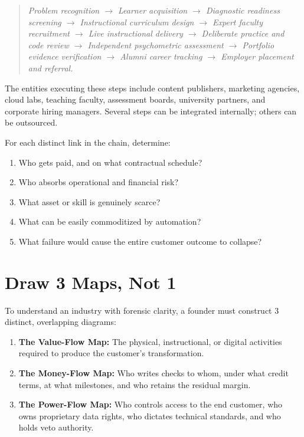 \begin{quote}
\centering\small\itshape
Problem recognition $\to$ Learner acquisition $\to$ Diagnostic readiness screening $\to$ Instructional curriculum design $\to$ Expert faculty recruitment $\to$ Live instructional delivery $\to$ Deliberate practice and code review $\to$ Independent psychometric assessment $\to$ Portfolio evidence verification $\to$ Alumni career tracking $\to$ Employer placement and referral.
\end{quote}

The entities executing these steps include content publishers, marketing agencies, cloud labs, teaching faculty, assessment boards, university partners, and corporate hiring managers. Several steps can be integrated internally; others can be outsourced.

For each distinct link in the chain, determine:
\begin{enumerate}[leftmargin=12pt,itemsep=1pt,topsep=1pt,parsep=0pt]
  \item Who gets paid, and on what contractual schedule?
  \item Who absorbs operational and financial risk?
  \item What asset or skill is genuinely scarce?
  \item What can be easily commoditized by automation?
  \item What failure would cause the entire customer outcome to collapse?
\end{enumerate}

\section{Draw 3 Maps, Not 1}

To understand an industry with forensic clarity, a founder must construct 3 distinct, overlapping diagrams:
\begin{enumerate}[leftmargin=12pt,itemsep=2pt,topsep=1pt,parsep=0pt]
  \item \textbf{The Value-Flow Map:} The physical, instructional, or digital activities required to produce the customer's transformation.
  \item \textbf{The Money-Flow Map:} Who writes checks to whom, under what credit terms, at what milestones, and who retains the residual margin.
  \item \textbf{The Power-Flow Map:} Who controls access to the end customer, who owns proprietary data rights, who dictates technical standards, and who holds veto authority.
\end{enumerate}

